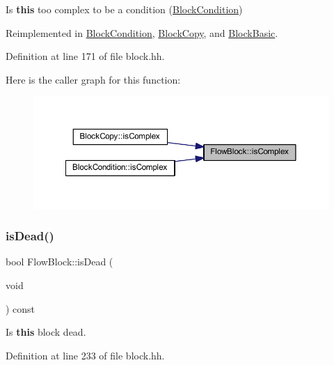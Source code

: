 Is {\bfseries{this}} too complex to be a condition (\mbox{\hyperlink{class_block_condition}{Block\+Condition}}) 



Reimplemented in \mbox{\hyperlink{class_block_condition_a38493adfe801b32d82244de3ee75c6fc}{Block\+Condition}}, \mbox{\hyperlink{class_block_copy_a3187e07356b398d20f12e36691522ced}{Block\+Copy}}, and \mbox{\hyperlink{class_block_basic_ad9dc5c967ac739b462614c1b75f93c22}{Block\+Basic}}.



Definition at line 171 of file block.\+hh.

Here is the caller graph for this function\+:
\nopagebreak
\begin{figure}[H]
\begin{center}
\leavevmode
\includegraphics[width=350pt]{class_flow_block_ad77905104bb4077b2d213c27b0582bf7_icgraph}
\end{center}
\end{figure}
\mbox{\label{class_flow_block_a964ff95b80c1427aa81bc2c1abe7aee2}} 
\subsubsection{\texorpdfstring{isDead()}{isDead()}}
{\footnotesize\ttfamily bool Flow\+Block\+::is\+Dead (\begin{DoxyParamCaption}\item[{void}]{ }\end{DoxyParamCaption}) const\hspace{0.3cm}{\ttfamily [inline]}}



Is {\bfseries{this}} block dead. 



Definition at line 233 of file block.\+hh.

\mbox{\label{class_flow_block_a905ae147d7a99ce2cfa5686b2f76193b}} 
